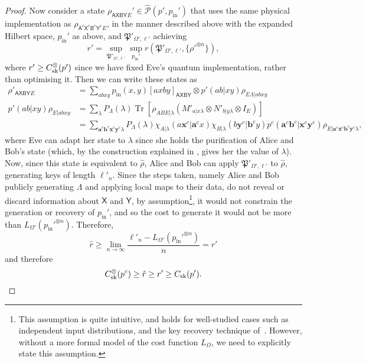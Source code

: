 \documentclass[10pt, a4paper]{article}
\numberwithin{equation}{section} %
\theoremstyle{definition}
\theoremstyle{plain}
\newcommand{\?}{\mathrel{?}} %
\newcommand{\cvec}[1]{\boldsymbol{\mathbf{#1}}}    %
\newcommand{\Tr}[2][]{\mathop{\mathrm{Tr}#1}\left[ #2 \right]} %
\newcommand{\crv}[1]{\mathsf{#1}}
\newcommand{\proj}[2][]{{[#2]}_{#1}}
\newcommand{\compatstates}[3][]{\hat{\mathcal{P}}#1(#2,#3)}
\newcommand{\proto}[2][_{\Omega,\ell}]{\mathfrak{#2}#1}
\newcommand{\prin}[1][p]{#1_{\mathrm{in}}}
\newcommand{\sk}{\rm sk}
\begin{document}
\begin{proof}
               Now consider a state \(\rho_{\crv{AXBY}{E}}' \in \compatstates{p'}{\prin'}\) that uses the same physical implementation as \(\rho_{\crv{A}^c\crv{X}^c \crv{B}^c\crv{Y}^c E}\), in the manner described above with the expanded Hilbert space, \(\prin'\) as above, and \(\proto['_{\Omega',\ell'}]{P}\) achieving
               \[
                 r' = \sup_{\proto['_{\Omega',\ell'}]{P}} \sup_{\prin'} r(\proto['_{\Omega',\ell'}]{P}, \{\rho'^{\otimes{n}}\}),
               \]
               where \(r' \geq C_{\sk}^{\otimes}(p')\) since we have fixed Eve's quantum implementation, rather than optimising it. Then we can write these states as
      \begin{align*}
          \rho'_{\crv{A}\crv{X} \crv{B}\crv{Y} E} &= \sum_{abxy} \prin(x,y) \proj[\crv{A}\crv{X} \crv{B}\crv{Y}]{axby} \otimes p'(ab|xy) \rho_{E\Lambda|abxy} \\
          p'(ab|xy) \rho_{E|abxy} &= \sum_{\lambda} P_{\Lambda}(\lambda) \Tr{ \rho_{ABE|\lambda} \left( M'_{a|x\lambda} \otimes N'_{b|y\lambda} \otimes I_{E} \right) } \\
                       &= \sum_{\cvec{a}^c\cvec{b}^c\cvec{x}^c\cvec{y}^c\lambda}
          P_{\Lambda}(\lambda) \chi_{A|\lambda}(a\cvec{x}^c|\cvec{a}^cx) \chi_{B|\lambda}(b\cvec{y}^c|\cvec{b}^cy)
          p^c(\cvec{a}^c\cvec{b}^c|\cvec{x}^c\cvec{y}^c)
          \rho_{E|\cvec{a}^c\cvec{x}^c \cvec{b}^c\cvec{y}^c\lambda},
      \end{align*}
      where Eve can adapt her state to \(\lambda\) since she holds the purification of Alice and Bob's state (which, by the construction explained in , gives her the value of \(\lambda\)). Now, since this state is equivalent to \(\hat{\rho}\), Alice and Bob can apply \(\proto['_{\Omega',\ell'}]{P}\) to \(\hat{\rho}\), generating keys of length \(\ell'_n\). Since the steps taken, namely Alice and Bob publicly generating \(\Lambda\) and applying local maps to their data, do not reveal or discard information about \(\crv{X}\) and \(\crv{Y}\), by assumption\footnote{This assumption is quite intuitive, and holds for well-studied cases such as independent input distributions, and the key recovery technique of~\cite[Prot. 2]{DIQKD_FiniteSize}. However, without a more formal model of the cost function \(L_{\Omega}\), we need to explicitly state this assumption.}, it would not constrain the generation or recovery of \(\prin'\), and so the cost to generate it would not be more than \(L_{\Omega'}(\prin'^{\otimes n})\). Therefore,
      \[ \hat{r} \geq \lim_{n\to\infty} \frac{\ell'_n - L_{\Omega'}(\prin'^{\otimes n})}{n} = r' \]
      and therefore
      \begin{equation}
      C_{\sk}^{\otimes}(p^c) \geq \hat{r} \geq r' \geq C_{\sk}(p').
      \end{equation}
    \end{proof}
\end{document}
